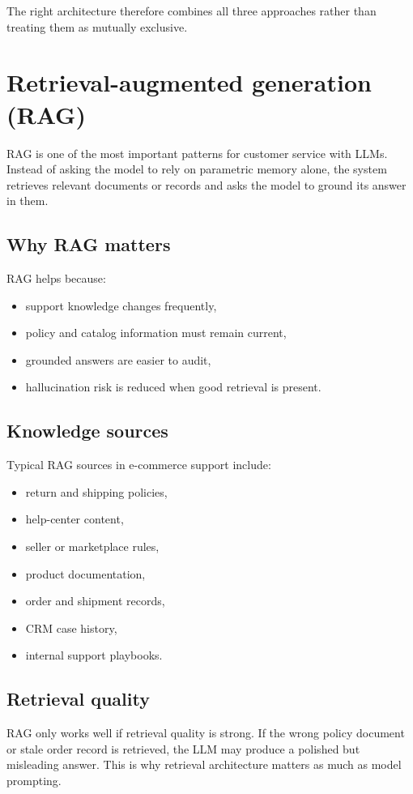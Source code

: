 The right architecture therefore combines all three approaches rather than treating them as mutually exclusive.

\section{Retrieval-augmented generation (RAG)}
RAG is one of the most important patterns for customer service with LLMs.
Instead of asking the model to rely on parametric memory alone, the system retrieves relevant documents or records and asks the model to ground its answer in them.

\subsection{Why RAG matters}
RAG helps because:
\begin{itemize}
  \item support knowledge changes frequently,
  \item policy and catalog information must remain current,
  \item grounded answers are easier to audit,
  \item hallucination risk is reduced when good retrieval is present.
\end{itemize}

\subsection{Knowledge sources}
Typical RAG sources in e-commerce support include:
\begin{itemize}
  \item return and shipping policies,
  \item help-center content,
  \item seller or marketplace rules,
  \item product documentation,
  \item order and shipment records,
  \item CRM case history,
  \item internal support playbooks.
\end{itemize}

\subsection{Retrieval quality}
RAG only works well if retrieval quality is strong.
If the wrong policy document or stale order record is retrieved, the LLM may produce a polished but misleading answer.
This is why retrieval architecture matters as much as model prompting.

